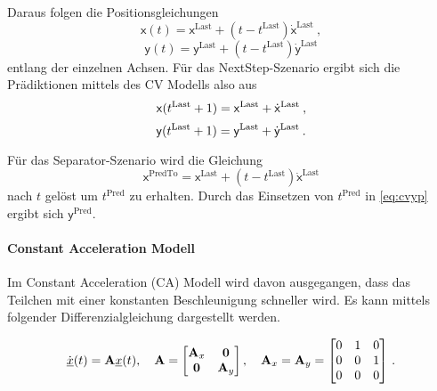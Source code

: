 Daraus folgen die Positionsgleichungen 
\begin{equation*}
    \mathsf{x}(t) = \mathsf{x}^{\text{Last}} + (t - t^{\text{Last}})\dot{\mathsf{x}}^{\text{Last}} \: ,
\end{equation*}
\begin{equation*}
    \mathsf{y}(t) = \mathsf{y}^{\text{Last}} + (t - t^{\text{Last}})\dot{\mathsf{y}}^{\text{Last}}
\end{equation*}
% 
entlang der einzelnen Achsen.
Für das NextStep-Szenario ergibt sich die Prädiktionen mittels des CV Modells also aus
\begin{equation*}
    \mathsf{x}(t{^{\text{Last}}}+1) = \mathsf{x}^{\text{Last}} + \dot{\mathsf{x}}^{\text{Last}} \: ,
\end{equation*}
\begin{equation}\label{eq:cvyp}
    \mathsf{y}(t{^{\text{Last}}}+1) = \mathsf{y}^{\text{Last}} + \dot{\mathsf{y}}^{\text{Last}} \: .
\end{equation}

Für das Separator-Szenario wird die Gleichung 
% 
\begin{equation*}
    \mathsf{x}^{\text{PredTo}} = \mathsf{x}^{\text{Last}} + (t - t^{\text{Last}})\dot{\mathsf{x}}^{\text{Last}}
\end{equation*}
% 
nach \(t\) gelöst um  \(t^{\text{Pred}}\) zu erhalten.
Durch das Einsetzen von \(t^{\text{Pred}}\) in \eqref{eq:cvyp} ergibt sich \(\mathsf{y}^{\text{Pred}}\).

\paragraph{Constant Acceleration Modell}

Im Constant Acceleration (CA) Modell wird davon ausgegangen, dass das Teilchen mit einer konstanten Beschleunigung schneller wird.
Es kann mittels folgender Differenzialgleichung dargestellt werden.

\begin{align*} \label{eq:speedCV}
    \dot{{\underline{x}}}(t) = {{\mathbf{A}}}{\underline{x}}(t), \quad {\ensuremath{{\mathbf{A}}}} = 
    \begin{bmatrix}
        {\ensuremath{{\mathbf{A}}}}_x & \boldsymbol{0} \\
        \boldsymbol{0} & {{\mathbf{A}}}_y
    \end{bmatrix} 
    , \quad
    {\ensuremath{{\mathbf{A}}}}_x = {{\mathbf{A}}}_y = 
    \begin{bmatrix}
        0 & 1 & 0 \\
        0 & 0 & 1 \\
        0 & 0 & 0
    \end{bmatrix} \, .
\end{align*}

